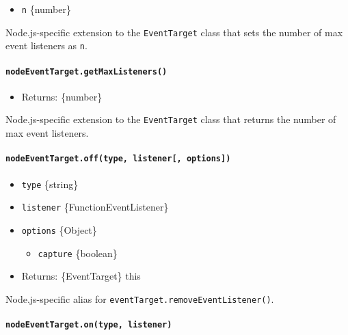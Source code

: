 \begin{itemize}
\tightlist
\item
  \texttt{n} \{number\}
\end{itemize}

Node.js-specific extension to the \texttt{EventTarget} class that sets
the number of max event listeners as \texttt{n}.

\paragraph{\texorpdfstring{\texttt{nodeEventTarget.getMaxListeners()}}{nodeEventTarget.getMaxListeners()}}\label{nodeeventtarget.getmaxlisteners}

\begin{itemize}
\tightlist
\item
  Returns: \{number\}
\end{itemize}

Node.js-specific extension to the \texttt{EventTarget} class that
returns the number of max event listeners.

\paragraph{\texorpdfstring{\texttt{nodeEventTarget.off(type,\ listener{[},\ options{]})}}{nodeEventTarget.off(type, listener{[}, options{]})}}\label{nodeeventtarget.offtype-listener-options}

\begin{itemize}
\item
  \texttt{type} \{string\}
\item
  \texttt{listener} \{Function\textbar EventListener\}
\item
  \texttt{options} \{Object\}

  \begin{itemize}
  \tightlist
  \item
    \texttt{capture} \{boolean\}
  \end{itemize}
\item
  Returns: \{EventTarget\} this
\end{itemize}

Node.js-specific alias for \texttt{eventTarget.removeEventListener()}.

\paragraph{\texorpdfstring{\texttt{nodeEventTarget.on(type,\ listener)}}{nodeEventTarget.on(type, listener)}}\label{nodeeventtarget.ontype-listener}

